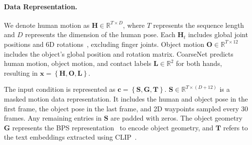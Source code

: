 


\paragraph{Data Representation.} 
We denote human motion as $\bm{H} \in \mathbb{R}^{T \times D}$, where $T$ represents the sequence length and $D$ represents the dimension of the human pose. Each $\bm{H}_{t}$ includes global joint positions and 6D rotations~\cite{zhou2019continuity}, excluding finger joints. Object motion $\bm{O} \in \mathbb{R}^{T \times 12}$ includes the object's global position and rotation matrix.
CoarseNet predicts human motion, object motion, and contact labels $\bm{L} \in \mathbb{R}^2$ for both hands, resulting in $\bm{x} = \left\{\bm{H}, \bm{O}, \bm{L}\right\}$.

The input condition is represented as $\bm{c} = \left\{\bm{S}, \bm{G}, \bm{T}\right\}$. $\bm{S} \in \mathbb{R}^{T \times (D+12)}$ is a masked motion data representation. It includes the human and object pose in the first frame, the object pose in the last frame, and 2D waypoints sampled every 30 frames. Any remaining entries in $\bm{S}$ are padded with zeros. The object geometry $\bm{G}$ represents the BPS representation~\cite{prokudin2019efficient} to encode object geometry, and $\bm{T}$ refers to the text embeddings extracted using CLIP~\cite{radford2021learning}.

